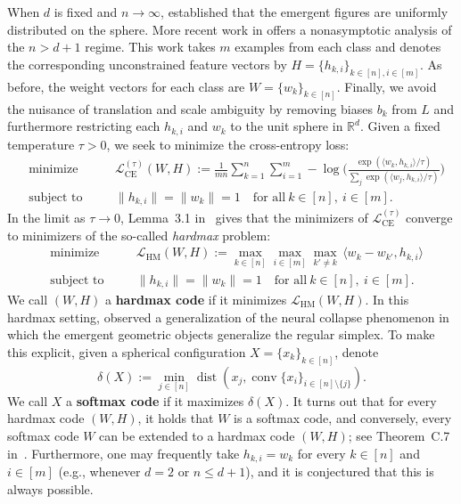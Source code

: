 \documentclass{article}
\theoremstyle{plain}
\theoremstyle{definition}
\begin{document}
When $d$ is fixed and $n\to\infty$, \cite{lu2022neural} established that the emergent figures are uniformly distributed on the sphere.
More recent work in \cite{JiangEtal:24} offers a nonasymptotic analysis of the $n>d+1$ regime.
This work takes $m$ examples from each class and denotes the corresponding unconstrained feature vectors by $H=\{h_{k,i}\}_{k\in[n],i\in[m]}$.
As before, the weight vectors for each class are $W=\{w_k\}_{k\in[n]}$.
Finally, we avoid the nuisance of translation and scale ambiguity by removing biases $b_k$ from $L$ and furthermore restricting each $h_{k,i}$ and $w_k$ to the unit sphere in $\mathbb{R}^d$.
Given a fixed temperature $\tau>0$, we seek to minimize the cross-entropy loss:
\[
\begin{aligned}
&\text{minimize}
\quad
&&\mathcal{L}_{\operatorname{CE}}^{(\tau)}(W,H):=
\frac{1}{mn}\sum_{k=1}^{n}\sum_{i=1}^{m} -\log \bigg( \frac{\exp(\langle w_k, h_{k,i}\rangle/\tau)  }{\sum_{j} \exp(\langle w_j, h_{k,i}\rangle/\tau)  } \bigg)\\[0.5em]
&
\text{subject to}
\quad
&&\|h_{k,i}\|=\|w_k\|=1 \quad \text{for all} ~ k\in[n],~i\in[m].
\end{aligned}
\]
In the limit as $\tau\to0$, Lemma~3.1 in~\cite{JiangEtal:24} gives that the minimizers of $\mathcal{L}_{\operatorname{CE}}^{(\tau)}$ converge to minimizers of the so-called \textit{hardmax} problem:
\[
\begin{aligned}
&\text{minimize}
\quad
&&\mathcal{L}_{\operatorname{HM}}(W,H):=
\max_{k\in [n]}\max_{i\in [m]}\max_{k'\neq k} \, \langle w_{k} - w_{k'}, h_{k,i} \rangle\\[0.5em]
&
\text{subject to}
\quad
&&\|h_{k,i}\|=\|w_k\|=1 \quad \text{for all} ~ k\in[n],~i\in[m].
\end{aligned}
\]
We call $(W,H)$ a \textbf{hardmax code} if it minimizes $\mathcal{L}_{\operatorname{HM}}(W,H)$.
In this hardmax setting, \cite{JiangEtal:24} observed a generalization of the neural collapse phenomenon in which the emergent geometric objects generalize the regular simplex.
To make this explicit, given a spherical configuration $X=\{x_k\}_{k\in[n]}$, denote
\[
\delta(X) 
:= \min_{j \in [n]} \operatorname{dist}(x_j, \operatorname{conv}\{x_i\}_{i \in [n] \setminus \{j\}}).
\]
We call $X$ a \textbf{softmax code} if it maximizes $\delta(X)$.
It turns out that for every hardmax code $(W,H)$, it holds that $W$ is a softmax code, and conversely, every softmax code $W$ can be extended to a hardmax code $(W,H)$; see Theorem~C.7 in~\cite{JiangEtal:24}.
Furthermore, one may frequently take $h_{k,i}=w_k$ for every $k\in[n]$ and $i\in[m]$ (e.g., whenever $d=2$ or $n\leq d+1$), and it is conjectured that this is always possible.
\end{document}

